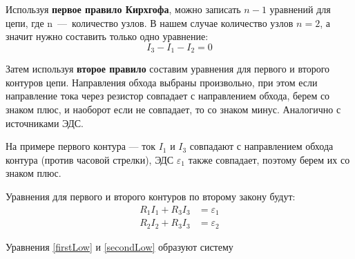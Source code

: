 \documentclass[14pt,a4paper]{article}
\begin{document}
Используя \textbf{первое правило Кирхгофа}, можно записать $n-1$ уравнений для цепи, где n~---~количество узлов. В нашем случае количество узлов $n=2$, а значит нужно составить только одно уравнение:
\begin{equation} \label{firstLow}
    I_3 -I_1 - I_2 = 0
\end{equation}

Затем используя \textbf{второе правило} составим уравнения для первого и второго контуров цепи. Направления обхода выбраны произвольно, при этом если направление тока через резистор совпадает с направлением обхода, берем со знаком плюс, и наоборот если не совпадает, то со знаком минус. Аналогично с источниками ЭДС.

На примере первого контура --- ток $I_1$ и $I_3$ совпадают с направлением обхода контура (против часовой стрелки), ЭДС $\varepsilon_1$ также совпадает, поэтому берем их со знаком плюс.

Уравнения для первого и второго контуров по второму закону будут:
\begin{equation} \label{secondLow}
    \begin{split}
        R_1I_1 + R_3I_3 & = \varepsilon_1 \\
        R_2I_2 +R_3I_3 & = \varepsilon_2
    \end{split}
\end{equation}

Уравнения \ref{firstLow} и \ref{secondLow} образуют систему
\end{document}

